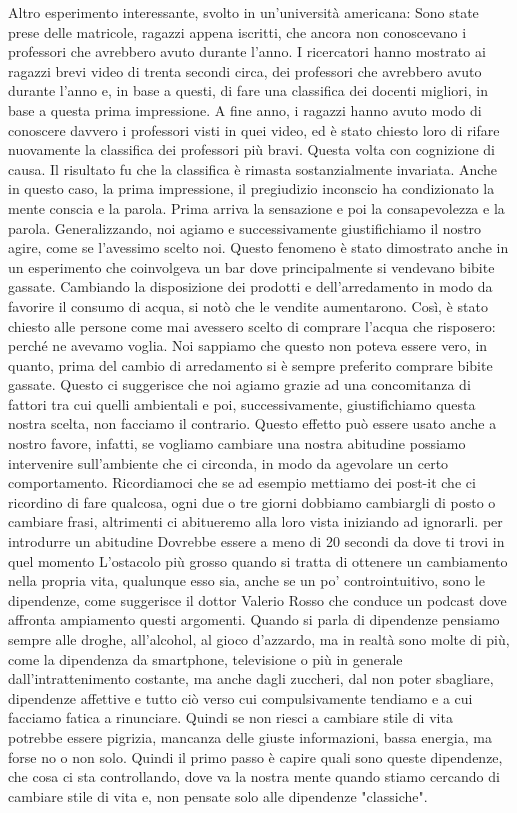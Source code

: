\documentclass[12pt]{book} %
\begin{document}
Altro esperimento interessante, svolto in un'università americana: Sono state prese delle
matricole, ragazzi appena iscritti, che ancora non conoscevano i professori che avrebbero avuto durante
l'anno. I ricercatori hanno mostrato ai ragazzi brevi video di trenta secondi circa, dei
professori che avrebbero avuto durante l'anno e, in base a questi, di fare una classifica dei
docenti migliori, in base a questa prima impressione. A fine anno, i ragazzi hanno avuto modo di conoscere davvero i
professori visti in quei video, ed è stato chiesto loro di rifare nuovamente la classifica dei professori più bravi.
Questa volta con cognizione di causa. Il risultato fu che la classifica è rimasta sostanzialmente invariata. Anche in
questo caso, la prima impressione, il pregiudizio inconscio ha condizionato la mente conscia e la parola. Prima arriva
la sensazione e poi la consapevolezza e la parola.
Generalizzando, noi agiamo e successivamente giustifichiamo il nostro agire, come se l'avessimo
scelto noi. Questo fenomeno è stato dimostrato anche in un esperimento che coinvolgeva un bar dove principalmente si
vendevano bibite gassate. Cambiando la disposizione dei prodotti e dell'arredamento in modo da
favorire il consumo di acqua, si notò che le vendite aumentarono. Così, è stato chiesto alle persone come mai avessero
scelto di comprare l'acqua che risposero: perché ne avevamo voglia. Noi sappiamo che questo non
poteva essere vero, in quanto, prima del cambio di arredamento si è sempre preferito comprare bibite gassate. Questo ci
suggerisce che noi agiamo grazie ad una concomitanza di fattori tra cui quelli ambientali e poi, successivamente,
giustifichiamo questa nostra scelta, non facciamo il contrario. Questo effetto può essere usato anche a nostro favore,
infatti, se vogliamo cambiare una nostra abitudine possiamo intervenire sull'ambiente che ci
circonda, in modo da agevolare un certo comportamento.
Ricordiamoci che se ad esempio mettiamo dei post-it che ci ricordino di fare qualcosa, ogni due o tre giorni dobbiamo cambiargli di posto o cambiare frasi, altrimenti ci abitueremo alla loro vista iniziando ad ignorarli.
per introdurre un abitudine Dovrebbe essere a meno di 20 secondi da dove ti trovi
in quel momento
L'ostacolo più grosso quando si tratta di ottenere un cambiamento nella propria vita, qualunque esso sia, anche se un po' controintuitivo, sono le dipendenze, come suggerisce il dottor Valerio Rosso che conduce un podcast dove affronta ampiamento questi argomenti. Quando si parla di dipendenze pensiamo sempre alle droghe, all'alcohol, al gioco d'azzardo, ma in realtà sono molte di più, come la dipendenza da smartphone, televisione o più in generale dall'intrattenimento costante, ma anche dagli zuccheri, dal non poter sbagliare, dipendenze affettive e tutto ciò verso cui compulsivamente tendiamo e a cui facciamo fatica a rinunciare. Quindi se non riesci a cambiare stile di vita potrebbe essere pigrizia, mancanza delle giuste informazioni, bassa energia, ma forse no o non solo. Quindi il primo passo è capire quali sono queste dipendenze, che cosa ci sta controllando, dove va la nostra mente quando stiamo cercando di cambiare stile di vita e, non pensate solo alle dipendenze "classiche".
\end{document}
